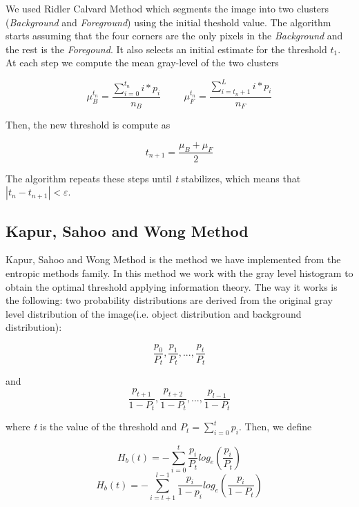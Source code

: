 \documentclass[12]{article}
\begin{document}
We used Ridler Calvard Method which segments the image into two clusters (\textit{Background} and \textit{Foreground}) using the initial theshold value. The algorithm starts assuming that the four corners are the only pixels in the \textit{Background} and the rest is the \textit{Foregound}. It also selects an initial estimate for the threshold \textit{$t_1$}. At each step we compute the mean gray-level of the two clusters
\vspace{-0.5cm}
\begin{center}
$$ \mu_{B}^{t_n} = \frac{\sum_{i = 0}^{t_n} i * p_i}{n_B} \hspace{1cm} \mu_{F}^{t_n} = \frac{\sum_{i = t_n + 1}^{L} i * p_i}{n_F} $$
\end{center}
Then, the new threshold is compute as
\vspace{-0.5cm}
\begin{center}
$$ t_{n + 1} = \frac{\mu_{B} + \mu_{F}}{2} $$
\end{center}
The algorithm repeats these steps until \textit{t} stabilizes, which means that $|t_n - t_{n + 1}| < \varepsilon $.

\subsection{Kapur, Sahoo and Wong Method}
Kapur, Sahoo and Wong Method is the method we have implemented from the entropic methods family. In this method we work with the gray level histogram to obtain the optimal threshold applying information theory.
The way it works is the following: two probability distributions are derived from the original gray level distribution of the image(i.e. object distribution and background distribution): 
\vspace{-0.5cm}
\begin{center}
$$\frac{p_0}{P_t},\frac{p_1}{P_t},...,\frac{p_t}{P_t}$$
\end{center} \begin{center}
and
$$\frac{p_{t+1}}{1-P_t},\frac{p_{t+2}}{1-P_t},...,\frac{p_{l-1}}{1-P_t}$$
\end{center}
\vspace{0.4cm}

where \textit{t} is the value of the threshold and $P_t = \sum_{i=0}^{t}{p_i}$. Then, we define

$$H_b(t) = - \sum_{i = 0}^{t} \frac{p_i}{P_t}log_e\left(\frac{p_i}{P_t}\right)$$
$$ H_b(t) = - \sum_{i = t+1}^{l-1} \frac{p_i}{1-p_i}log_e\left(\frac{p_i}{1-P_t}\right)$$
\end{document}
